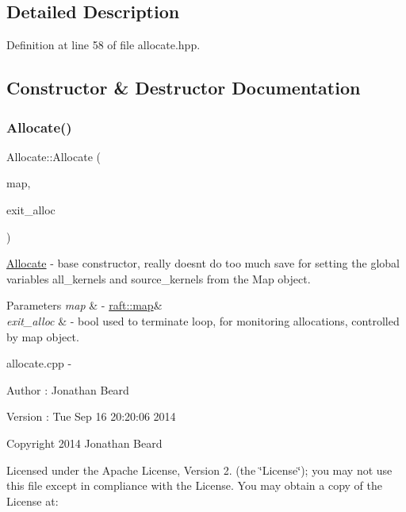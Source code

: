 \subsection{Detailed Description}


Definition at line 58 of file allocate.\+hpp.



\subsection{Constructor \& Destructor Documentation}
\hypertarget{class_allocate_ab2b82e7fab9d0fccb9702effec93917b}{}\label{class_allocate_ab2b82e7fab9d0fccb9702effec93917b} 
\subsubsection{\texorpdfstring{Allocate()}{Allocate()}}
{\footnotesize\ttfamily Allocate\+::\+Allocate (\begin{DoxyParamCaption}\item[{\hyperlink{classraft_1_1map}{raft\+::map} \&}]{map,  }\item[{volatile bool \&}]{exit\+\_\+alloc }\end{DoxyParamCaption})}

\hyperlink{class_allocate}{Allocate} -\/ base constructor, really doesn\textquotesingle{}t do too much save for setting the global variables all\+\_\+kernels and source\+\_\+kernels from the Map object. 
\begin{DoxyParams}{Parameters}
{\em map} & -\/ \hyperlink{classraft_1_1map}{raft\+::map}\& \\
\hline
{\em exit\+\_\+alloc} & -\/ bool used to terminate loop, for monitoring allocations, controlled by map object.\\
\hline
\end{DoxyParams}
allocate.\+cpp -\/ \begin{DoxyAuthor}{Author}
\+: Jonathan Beard 
\end{DoxyAuthor}
\begin{DoxyVersion}{Version}
\+: Tue Sep 16 20\+:20\+:06 2014
\end{DoxyVersion}
Copyright 2014 Jonathan Beard

Licensed under the Apache License, Version 2. (the \char`\"{}\+License\char`\"{}); you may not use this file except in compliance with the License. You may obtain a copy of the License at\+:

